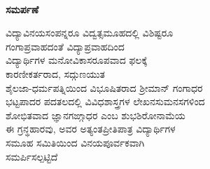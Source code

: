 \thispagestyle{empty}
~
\vfill
\begin{mdframed}[roundcorner=10pt]
\phantom{i}
\medskip
{}
\centering
{\Large\bfseries ಸಮರ್ಪಣೆ}
\bigskip

ವಿದ್ಯಾವಿನಯಸಂಪನ್ನರೂ ವಿದ್ವತ್ಸಮೂಹದಲ್ಲಿ ವಿಶಿಷ್ಟರೂ \\ಗಂಗಾಪ್ರವಾಹದಂತೆ ವಿದ್ಯಾಪ್ರವಾಹದಿಂದ\\
ವಿದ್ಯಾರ್ಥಿಗಳ ಮನೋವಿಕಾಸರೂಪವಾದ ಫಲಕ್ಕೆ \\ಕಾರಣೀಕರ್ತರಾದ, ಸದ್ಗುಣಯುತ\\
ಶೈಲಜಾ-ಧರ್ಮಪತ್ನಿಯಿಂದ ವಿಭೂಷಿತರಾದ ಶ್ರೀಮಾನ್ ಗಂಗಾಧರ\\
ಭಟ್ಟಪಾದರ ಪದತಲದಲ್ಲಿ ವಿವಿಧಶಾಸ್ತ್ರಗಳ ಲೇಖನಸುಮನಸಗಳಿಂದ\\
ಶೋಭಿತವಾದ ಜ್ಞಾನಗಙ್ಗಾಧರ ಎಂಬ ಶುಭಶಿರೋನಾಮೆಯ\\
ಈ ಗ್ರನ್ಥಹಾರವು, ಅವರ ಅತ್ಯಂತಪ್ರೀತಿಪಾತ್ರ ವಿದ್ಯಾರ್ಥಿಗಳ\\
ಸಮೂಹ ಸಮಿತಿಯಿಂದ ವಿನಯಪೂರ್ವಕವಾಗಿ\\
ಸಮರ್ಪಿಸಲ್ಪಟ್ಟಿದೆ
\bigskip
\phantom{i}
\end{mdframed}
\vfill

